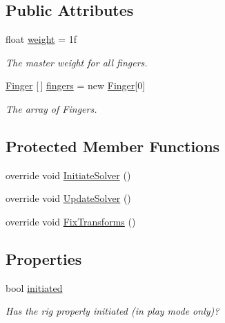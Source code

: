 \subsection*{Public Attributes}
\begin{DoxyCompactItemize}
\item 
float \mbox{\hyperlink{class_root_motion_1_1_final_i_k_1_1_finger_rig_a6527b263ac0f525aa90864f4f6599eb1}{weight}} = 1f
\begin{DoxyCompactList}\small\item\em The master weight for all fingers. \end{DoxyCompactList}\item 
\mbox{\hyperlink{class_root_motion_1_1_final_i_k_1_1_finger}{Finger}} \mbox{[}$\,$\mbox{]} \mbox{\hyperlink{class_root_motion_1_1_final_i_k_1_1_finger_rig_a4e61dbcff39c1d064c3f6514c34d44d2}{fingers}} = new \mbox{\hyperlink{class_root_motion_1_1_final_i_k_1_1_finger}{Finger}}\mbox{[}0\mbox{]}
\begin{DoxyCompactList}\small\item\em The array of Fingers. \end{DoxyCompactList}\end{DoxyCompactItemize}
\subsection*{Protected Member Functions}
\begin{DoxyCompactItemize}
\item 
override void \mbox{\hyperlink{class_root_motion_1_1_final_i_k_1_1_finger_rig_aa32e72eb590a6e441ed8de3f1ce95655}{Initiate\+Solver}} ()
\item 
override void \mbox{\hyperlink{class_root_motion_1_1_final_i_k_1_1_finger_rig_a17665e6e48b665fffb30dfd90f270fca}{Update\+Solver}} ()
\item 
override void \mbox{\hyperlink{class_root_motion_1_1_final_i_k_1_1_finger_rig_ab11b46b8b2c81897b17c451c4c536b1f}{Fix\+Transforms}} ()
\end{DoxyCompactItemize}
\subsection*{Properties}
\begin{DoxyCompactItemize}
\item 
bool \mbox{\hyperlink{class_root_motion_1_1_final_i_k_1_1_finger_rig_a92bf1c8610eef3e8f5f7ee1d13d4460a}{initiated}}
\begin{DoxyCompactList}\small\item\em Has the rig properly initiated (in play mode only)? \end{DoxyCompactList}\end{DoxyCompactItemize}


